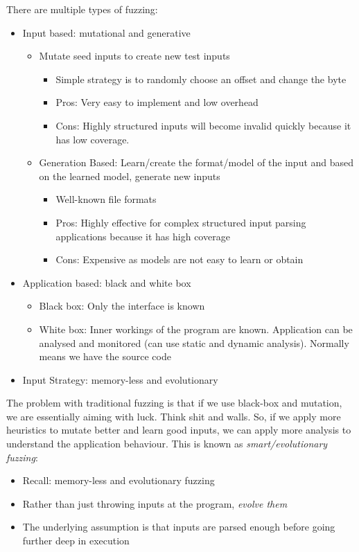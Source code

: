 \documentclass[11pt,a4paper,titlepage,dvipsnames,cmyk]{scrartcl}
\begin{document}
There are multiple types of fuzzing:
\begin{itemize}
    \item Input based: mutational and generative
    \begin{itemize}
        \item Mutate seed inputs to create new test inputs
        \begin{itemize}
            \item Simple strategy is to randomly choose an offset and change the byte
            \item Pros: Very easy to implement and low overhead
            \item Cons: Highly structured inputs will become invalid quickly because it has low coverage.
        \end{itemize}
        \item Generation Based: Learn/create the format/model of the input and based on the learned model, generate new inputs
        \begin{itemize}
            \item Well-known file formats
            \item Pros: Highly effective for complex structured input parsing applications because it has high coverage
            \item Cons: Expensive as models are not easy to learn or obtain
        \end{itemize}
    \end{itemize}
    \item Application based: black and white box
    \begin{itemize}
        \item Black box: Only the interface is known
        \item White box: Inner workings of the program are known. Application can be analysed and monitored (can use static and dynamic analysis). Normally means we have the source code
    \end{itemize}
    \item Input Strategy: memory-less and evolutionary
\end{itemize}

The problem with traditional fuzzing is that if we use black-box and mutation, we are essentially aiming with luck. Think shit and walls. So, if we apply more heuristics to mutate better and learn good inputs, we can apply more analysis to understand the application behaviour. This is known as \textit{smart/evolutionary fuzzing}:
\begin{itemize}
    \item Recall: memory-less and evolutionary fuzzing
    \item Rather than just throwing inputs at the program, \textit{evolve them}
    \item The underlying assumption is that inputs are parsed enough before going further deep in execution
\end{itemize}
\end{document}
